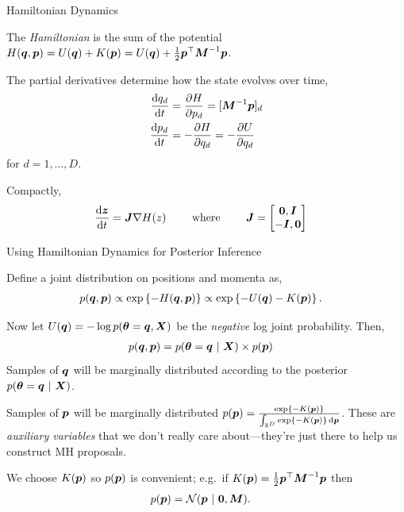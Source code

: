 \documentclass[aspectratio=169]{beamer}
\begin{document}
\begin{frame}[t,allowframebreaks]{Hamiltonian Dynamics}\label{hamiltonian-dynamics}

The \emph{Hamiltonian} is the sum of the potential
\(H(\boldsymbol{q}, \boldsymbol{p}) = U(\boldsymbol{q}) + K(\boldsymbol{p}) = U(\boldsymbol{q}) + \frac{1}{2} \boldsymbol{p}^\top \boldsymbol{M}^{-1} \boldsymbol{p}\).

The partial derivatives determine how the state evolves over time,
\begin{align*}
    \frac{\mathop{}\!\mathrm{d} q_d}{\mathop{}\!\mathrm{d} t} &= \frac{\partial H}{\partial p_d} = [\boldsymbol{M}^{-1} \boldsymbol{p}]_d \\
    \frac{\mathop{}\!\mathrm{d} p_d}{\mathop{}\!\mathrm{d} t} &= -\frac{\partial H}{\partial q_d} = -\frac{\partial  U}{\partial q_d}
\end{align*} for \(d=1,\ldots, D\).

Compactly, \begin{align*}
    \frac{\mathop{}\!\mathrm{d} \boldsymbol{z}}{\mathop{}\!\mathrm{d} t} &= \boldsymbol{J} \nabla H(z)
    \qquad\text{ where } \qquad
    \boldsymbol{J} = \begin{bmatrix} \boldsymbol{0}, \boldsymbol{I} \\ -\boldsymbol{I}, \boldsymbol{0}
    \end{bmatrix}
\end{align*} 
\end{frame}

    

\begin{frame}[t,allowframebreaks]{Using Hamiltonian Dynamics for Posterior
Inference}\label{using-hamiltonian-dynamics-for-posterior-inference}

Define a joint distribution on positions and momenta as, \begin{align*}
    p(\boldsymbol{q}, \boldsymbol{p}) &\propto \exp \left \{-H(\boldsymbol{q}, \boldsymbol{p}) \right \} \propto 
    \exp \left \{-U(\boldsymbol{q}) - K(\boldsymbol{p})\right \}.
\end{align*}

Now let \(U(\boldsymbol{q}) = -\log p(\boldsymbol{\theta} = \boldsymbol{q}, \boldsymbol{X})\) be the
\emph{negative} log joint probability. Then, \begin{align*}
    p(\boldsymbol{q}, \boldsymbol{p}) &= p(\boldsymbol{\theta} = \boldsymbol{q} ~\vert~ \boldsymbol{X}) \times p(\boldsymbol{p})
\end{align*} Samples of \(\boldsymbol{q}\) will be marginally distributed
according to the posterior \(p(\boldsymbol{\theta} = \boldsymbol{q} ~\vert~ \boldsymbol{X})\).

Samples of \(\boldsymbol{p}\) will be marginally distributed
\(p(\boldsymbol{p}) = \frac{\exp \{ -K(\boldsymbol{p})\}}{\int_{\mathbb{R}^D} \exp \{-K(\boldsymbol{p})\} \mathop{}\!\mathrm{d} \boldsymbol{p}}\).
These are \emph{auxiliary variables} that we don't really care
about---they're just there to help us construct MH proposals.

We choose \(K(\boldsymbol{p})\) so \(p(\boldsymbol{p})\) is convenient; e.g.~if
\(K(\boldsymbol{p}) = \frac{1}{2} \boldsymbol{p}^\top \boldsymbol{M}^{-1} \boldsymbol{p}\) then \begin{align*}
    p(\boldsymbol{p}) &= \mathcal{N}(\boldsymbol{p} ~\vert~ \boldsymbol{0}, \boldsymbol{M}).
\end{align*}
\end{frame}
\end{document}
